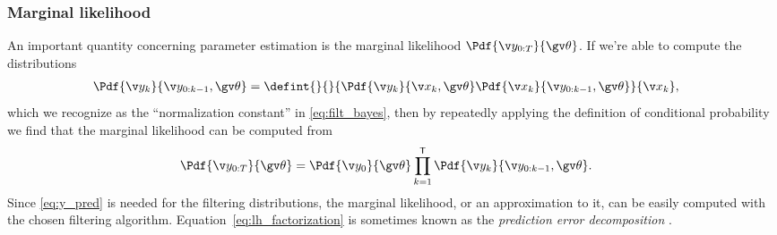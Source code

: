 \subsubsection*{Marginal likelihood}

An important quantity concerning parameter estimation is the marginal likelihood $\Pdf{\Y}{\Th}$. 
If we're able to compute the distributions
\begin{align}
	\Pdf{\y_k}{\y_{0:k-1},\Th}&=\defint{}{}{\Pdf{\yk}{\xk,\Th}\Pdf{\xk}{\y_{0:k-1},\Th}}{\xk},
	\label{eq:y_pred}
\end{align}
which we recognize as the ``normalization constant'' in \eqref{eq:filt_bayes},
then by repeatedly applying the definition of conditional probability 
we find that the marginal likelihood can be computed from
\begin{align}
	\Pdf{\Y}{\Th}&=\Pdf{\y_0}{\Th}\prod_{k=1}^\tr \Pdf{\y_k}{\y_{0:k-1},\Th}.
	\label{eq:lh_factorization}
\end{align}
Since \eqref{eq:y_pred} is needed for the filtering distributions, the marginal likelihood, or an approximation to it, can be easily
computed with the chosen filtering algorithm. Equation~\eqref{eq:lh_factorization} is sometimes known 
as the \emph{prediction error decomposition} \parencite{Harvey1990}.




